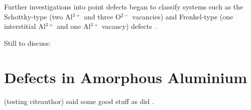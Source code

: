 Further investigations into point defects began to classify systems such as the Schottky-type (two Al$^{3+}$ and three O$^{2-}$ vacancies) and Frenkel-type (one interstitial Al$^{3+}$ and one Al$^{3+}$ vacancy) defects~\cite{Mohapatra1978}.


Still to discuss: \cite{Matsunaga2003,Carrasco2004,Perevalov2010,Pustovarov2011,Elliot2013}

\section{Defects in Amorphous Aluminium}

(testing citeauthor) \citeauthor{Momida2011} said some good stuff as did \citeauthor{Blochl1994}.
